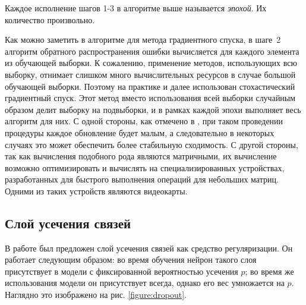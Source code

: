 \documentclass[14pt, a4paper]{extarticle}
\begin{document}
Каждое исполнение шагов 1-3 в алгоритме выше называется \textit{эпохой}. Их количество произвольно.

Как можно заметить в алгоритме для метода градиентного спуска, в шаге~2 алгоритм обратного распространения ошибки вычисляется для каждого элемента из обучающей выборки. К сожалению, применение методов, использующих всю выборку, отнимает слишком много вычислительных ресурсов в случае большой обучающей выборки. Поэтому на практике и далее использован стохастический градиентный спуск. Этот метод вместо использования всей выборки случайным образом делит выборку на подвыборки, и в рамках каждой эпохи выполняет весь алгоритм для них. С одной стороны, как отмечено в \cite{sgd}, при таком проведении процедуры каждое обновление будет малым, а следовательно в некоторых случаях это может обеспечить более стабильную сходимость. С другой стороны, так как вычисления подобного рода являются матричными, их вычисление возможно оптимизировать и вычислять на специализированных устройствах, разработанных для быстрого выполнения операций для небольших матриц. Одними из таких устройств являются видеокарты.

\subsection*{Слой усечения связей}
В работе \cite{dropout} был предложен слой усечения связей как средство регуляризации. Он работает следующим образом: во время обучения нейрон такого слоя присутствует в модели с фиксированной вероятностью усечения $p$; во время же использования модели он присутствует всегда, однако его вес умножается на $p$. Наглядно это изображено на рис. \ref{figure:dropout}.
\end{document}
